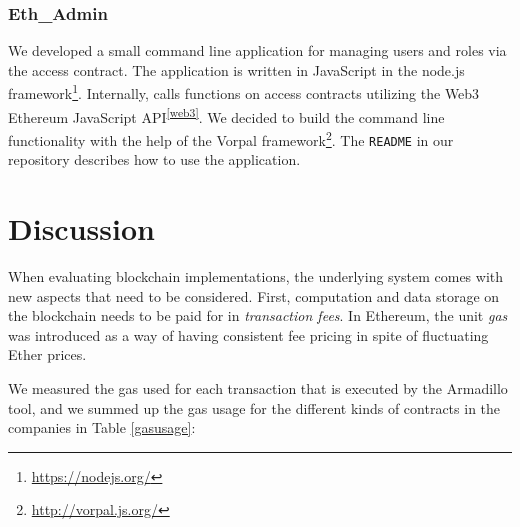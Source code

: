 \documentclass[runningheads]{llncs}
\begin{document}
\subsubsection{Eth\_Admin}

We developed a small command line application for managing users and roles via the access contract.
The application is written in JavaScript in the node.js framework\footnote{\url{https://nodejs.org/}}.
Internally, calls functions on access contracts utilizing the Web3 Ethereum JavaScript API\textsuperscript{\ref{web3}}.
We decided to build the command line functionality with the help of the Vorpal framework\footnote{\url{http://vorpal.js.org/}}.
The \texttt{README} in our repository describes how to use the application.

\section{Discussion} \label{evaluation}

When evaluating blockchain implementations, the underlying system comes with new aspects that need to be considered.
First, computation and data storage on the blockchain needs to be paid for in \emph{transaction fees}.
In Ethereum, the unit \emph{gas} was introduced as a way of having consistent fee pricing in spite of fluctuating Ether prices.

We measured the gas used for each transaction that is executed by the Armadillo tool, and we summed up the gas usage for the different kinds of contracts in the companies in Table \ref{gasusage}:
\end{document}
